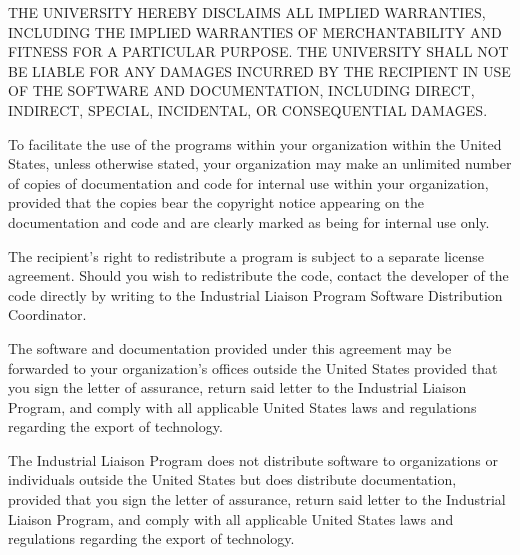 THE UNIVERSITY HEREBY DISCLAIMS ALL IMPLIED WARRANTIES, INCLUDING THE
IMPLIED WARRANTIES OF MERCHANTABILITY AND FITNESS FOR A PARTICULAR
PURPOSE.
THE UNIVERSITY SHALL NOT BE LIABLE FOR ANY DAMAGES INCURRED BY THE
RECIPIENT IN USE OF THE SOFTWARE AND DOCUMENTATION, INCLUDING DIRECT,
INDIRECT, SPECIAL, INCIDENTAL, OR CONSEQUENTIAL DAMAGES.

To facilitate the use of the programs within your organization within
the United States, unless otherwise stated, your organization may make
an unlimited number of copies of documentation and code for internal
use within your organization, provided that the copies bear the
copyright notice appearing on the documentation and code and are
clearly marked as being for internal use only.

The recipient's right to redistribute a program is subject to a
separate license agreement.  Should you wish to redistribute the code,
contact the developer of the code directly by writing to the
Industrial Liaison Program Software Distribution Coordinator.

The software and documentation provided under this agreement may be
forwarded to your organization's offices outside the United States
provided that you sign the letter of assurance, return said letter to
the Industrial Liaison Program, and comply with all applicable United
States laws and regulations regarding the export of technology.

The Industrial Liaison Program does not distribute software to
organizations or individuals outside the United States but does
distribute documentation, provided that you sign the letter of
assurance, return said letter to the Industrial Liaison Program, and
comply with all applicable United States laws and regulations
regarding the export of technology.

\vspace*{3ex}

